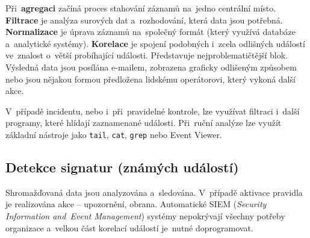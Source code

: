 \begin{figure}
\end{figure}

Při~\textbf{agregaci} začíná proces stahování záznamů na~jedno centrální místo. \textbf{Filtrace} je analýza surových dat a~rozhodování, která data jsou potřebná. \textbf{Normalizace} je úprava záznamů na~společný formát (který využívá databáze a~analytické systémy). \textbf{Korelace} je spojení podobných i~zcela odlišných událostí ve~znalost o~větší probíhající události. Představuje nejproblematičtější blok. Výsledná data jsou posílána e-mailem, zobrazena graficky odlišeným způsobem nebo jsou nějakou formou předložena lidskému operátorovi, který vykoná další akce.

V~případě incidentu, nebo i~při~pravidelné kontrole, lze využívat filtraci i~další programy, které hlídají zaznamenané události. Při~ruční analýze lze využít základní nástroje jako \texttt{tail}, \texttt{cat}, \texttt{grep} nebo Event Viewer.

\subsection{Detekce signatur (známých událostí)}

Shromažďovaná data jsou analyzována a~sledována. V~případě aktivace pravidla je realizována akce -- upozornění, obrana. Automatické SIEM (\emph{Security Information and~Event Management}) systémy nepokrývají všechny potřeby organizace a~velkou část korelací událostí je~nutné doprogramovat.

